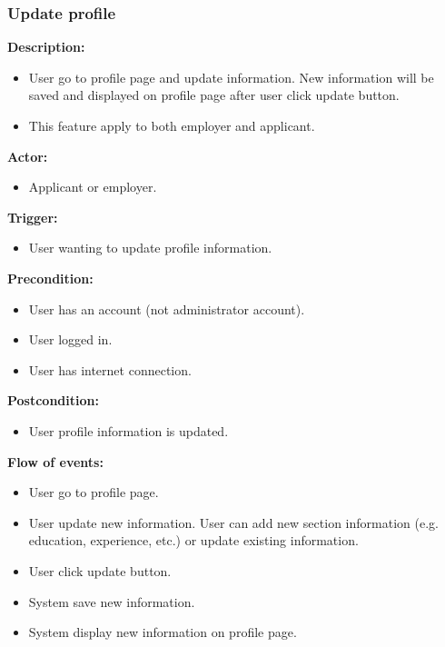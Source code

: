 \documentclass[a4paper]{article}
\begin{document}
        \subsubsection{Update profile}
        \textbf{Description:}
        \begin{itemize}
            \item User go to profile page and update information. New information will be saved and displayed on profile page after user click update button.
            \item This feature apply to both employer and applicant.
        \end{itemize}

        \textbf{Actor:}
        \begin{itemize}
            \item Applicant or employer.
        \end{itemize}

        \textbf{Trigger:}
        \begin{itemize}
            \item User wanting to update profile information.
        \end{itemize}

        \textbf{Precondition:}
        \begin{itemize}
            \item User has an account (not administrator account).
            \item User logged in.
            \item User has internet connection.
        \end{itemize}

        \textbf{Postcondition:}
        \begin{itemize}
            \item User profile information is updated.
        \end{itemize}

        \textbf{Flow of events:}
        \begin{itemize}
            \item User go to profile page.
            \item User update new information. User can add new section information (e.g. education, experience, etc.) or update existing information.
            \item User click update button.
            \item System save new information.
            \item System display new information on profile page.
        \end{itemize}
\end{document}

